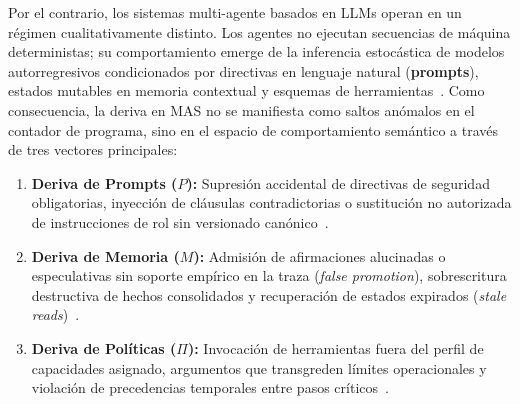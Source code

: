 \documentclass[conference]{IEEEtran}
\begin{document}
Por el contrario, los sistemas multi-agente basados en LLMs operan en un r\'egimen cualitativamente distinto. Los agentes no ejecutan secuencias de m\'aquina deterministas; su comportamiento emerge de la inferencia estoc\'astica de modelos autorregresivos condicionados por directivas en lenguaje natural (\textbf{prompts}), estados mutables en memoria contextual y esquemas de herramientas~\cite{anand2026, wangj2026}. Como consecuencia, la deriva en MAS no se manifiesta como saltos an\'omalos en el contador de programa, sino en el espacio de comportamiento sem\'antico a trav\'es de tres vectores principales:
\begin{enumerate}
    \item \textbf{Deriva de Prompts ($P$):} Supresi\'on accidental de directivas de seguridad obligatorias, inyecci\'on de cl\'ausulas contradictorias o sustituci\'on no autorizada de instrucciones de rol sin versionado can\'onico~\cite{tafreshipour2025, miranda2026}.
    \item \textbf{Deriva de Memoria ($M$):} Admisi\'on de afirmaciones alucinadas o especulativas sin soporte emp\'irico en la traza (\emph{false promotion}), sobrescritura destructiva de hechos consolidados y recuperaci\'on de estados expirados (\emph{stale reads})~\cite{rafique2026, qi2026, sureshkumar2026}.
    \item \textbf{Deriva de Pol\'iticas ($\Pi$):} Invocaci\'on de herramientas fuera del perfil de capacidades asignado, argumentos que transgreden l\'imites operacionales y violaci\'on de precedencias temporales entre pasos cr\'iticos~\cite{wangh2026, wangs2026, xia2026}.
\end{enumerate}
\end{document}
